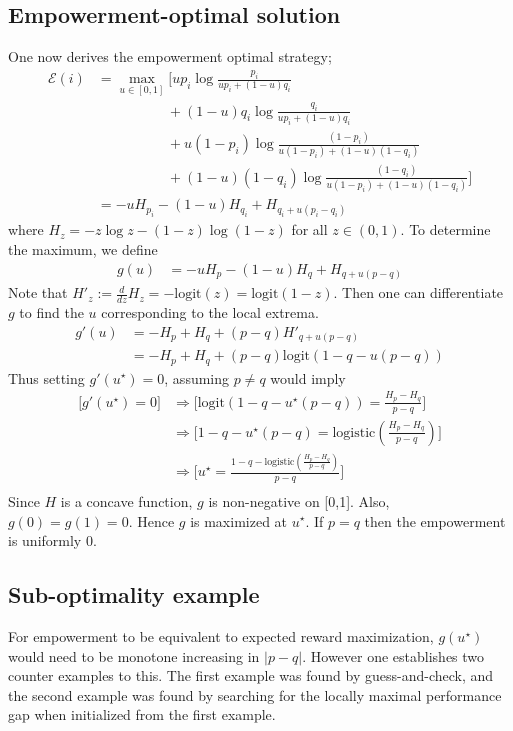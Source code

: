\documentclass{article}
\newcommand{\Ee}{\mathcal{E}}
\begin{document}
\subsection{Empowerment-optimal solution}
One now derives the empowerment optimal strategy; 
\begin{align*}
\Ee(i) 
	&= \max_{u\in [0,1]}\bigg[up_i \log \frac{p_i}{up_i+(1-u)q_i}\\
	&\hspace{5em} + (1-u)q_i \log \frac{q_i}{up_i+(1-u)q_i}\\
	&\hspace{5em} + u(1-p_i) \log \frac{(1-p_i)}{u(1-p_i)+(1-u)(1-q_i)}\\
	&\hspace{5em} + (1-u)(1-q_i) \log \frac{(1-q_i)}{u(1-p_i)+(1-u)(1-q_i)}\bigg]\\
	&=-uH_{p_i}-(1-u)H_{q_i}+H_{q_i+u(p_i-q_i)}
\end{align*}
where $H_z=-z\log z - (1-z)\log(1-z)$ for all $z\in (0,1)$. To determine the maximum, we define 
\begin{align*}
g(u)&= -uH_{p}-(1-u)H_{q}+H_{q+u(p-q)} 
\end{align*}
Note that $H'_z:=\frac{d}{dz} H_z= -\text{logit}(z)=\text{logit}(1-z)$.
Then one can differentiate $g$ to find the $u$ corresponding to the local extrema.
\begin{align*}
g'(u) 
	&= -H_p + H_q + (p-q)H'_{q+u(p-q)}\\
	&= -H_p + H_q +(p-q)\text{logit}(1-q-u(p-q))
\end{align*}
Thus setting $g'(u^\star)=0$, assuming $p\neq q$ would imply
\begin{align*}
\bigg[g'(u^\star)=0\bigg]
	&\Rightarrow\bigg[\text{logit}(1-q-u^\star(p-q)) = \frac{H_{p}-H_{q}}{p-q}\bigg]\\
	&\Rightarrow\bigg[1-q-u^\star(p-q) = \text{logistic}\left(\frac{H_{p}-H_{q}}{p-q}\right)\bigg]\\
	&\Rightarrow\bigg[u^\star=\frac{1-q-\text{logistic}\left(\frac{H_{p}-H_{q}}{p-q}\right)}{p-q} \bigg]\\
\end{align*}
Since $H$ is a concave function, $g$ is non-negative on [0,1]. Also, $g(0)=g(1)=0$. Hence $g$ is maximized at $u^\star$. If $p=q$ then the empowerment is uniformly $0$.

\subsection{Sub-optimality example}
For empowerment to be equivalent to expected reward maximization, $g(u^\star)$ would need to be monotone increasing in $|p-q|$. However one establishes two counter examples to this. The first example was found by guess-and-check, and the second example was found by searching for the locally maximal performance gap when initialized from the first example. 
\end{document}
